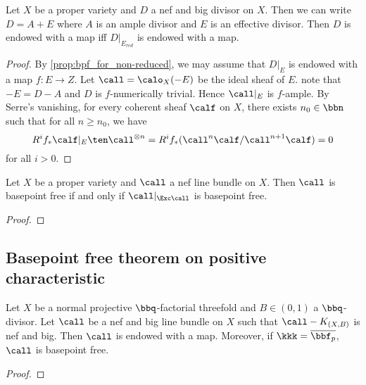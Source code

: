     \begin{proposition}\label{prop:basepoint_free_nef_big_iff_effective_locus_char_p}
        Let \(X\) be a proper variety and \(D\) a nef and big divisor on \(X\).
        Then we can write \(D = A + E\) where \(A\) is an ample divisor and \(E\) is an effective divisor.
        Then \(D\) is endowed with a map iff \(D|_{E_{red}}\) is endowed with a map.
    \end{proposition}
    \begin{proof}
        By \cref{prop:bpf_for_non-reduced}, we may assume that \(D|_E\) is endowed with a map \(f: E \to Z\).
        Let \(\call = \calo_X(-E)\) be the ideal sheaf of \(E\).
        note that \(-E = D - A\) and \(D\) is \(f\)-numerically trivial.
        Hence \(\call|_E\) is \(f\)-ample.
        By Serre's vanishing, for every coherent sheaf \(\calf\) on \(X\), 
        there exists \(n_0 \in \bbn\) such that for all \(n \geq n_0\), we have 
        \[ R^if_* \calf|_E \ten \call^{\otimes n} = R^if_* (\call^n\calf/\call^{n+1}\calf) = 0 \]
        for all \(i > 0\).
        

    \end{proof}

    \begin{theorem}\label{thm:bpf_iff_bpf_on_exceptional_locus}
        Let \(X\) be a proper variety and \(\call\) a nef line bundle on \(X\).
        Then \(\call\) is basepoint free if and only if \(\call|_{\Exc \call}\) is basepoint free.
    \end{theorem}
    \begin{proof}
    \end{proof}


\subsection{Basepoint free theorem on positive characteristic}

    \begin{theorem}\label{thm:basepoint_free_nef_big_char_p}
        Let $X$ be a normal projective \(\bbq\)-factorial threefold and \(B \in (0,1)\) a \(\bbq\)-divisor.
        Let \(\call\) be a nef and big line bundle on \(X\) such that \(\call - K_{(X,B)}\) is nef and big.
        Then \(\call\) is endowed with a map.
        Moreover, if \(\kkk = \overline{\bbf_p}\), \(\call\) is basepoint free.
    \end{theorem}
    \begin{proof}
    \end{proof}


    